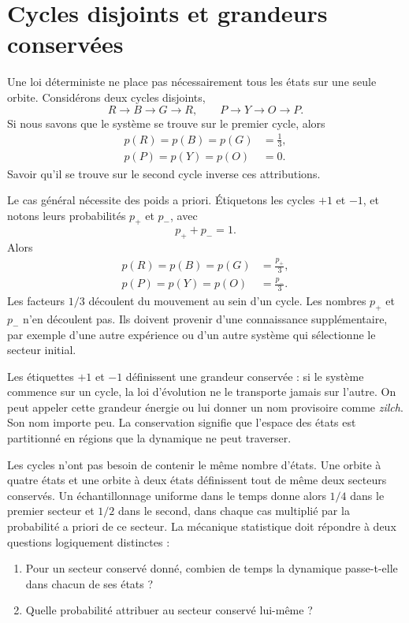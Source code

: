 \section{Cycles disjoints et grandeurs conservées}

Une loi déterministe ne place pas nécessairement tous les états sur une seule orbite. Considérons deux cycles disjoints,
\begin{equation}
 R\longrightarrow B\longrightarrow G\longrightarrow R,
 \qquad
 P\longrightarrow Y\longrightarrow O\longrightarrow P.
 \label{eq:sm1-two-cycles}
\end{equation}
Si nous savons que le système se trouve sur le premier cycle, alors
\begin{equation}
 \begin{aligned}
 p(R)=p(B)=p(G)&=\frac13,\\
 p(P)=p(Y)=p(O)&=0.
 \end{aligned}
\end{equation}
Savoir qu’il se trouve sur le second cycle inverse ces attributions.

Le cas général nécessite des poids a priori. Étiquetons les cycles \(+1\) et
\(-1\), et notons leurs probabilités \(p_+\) et \(p_-\), avec
\begin{equation}
 p_++p_-=1.
\end{equation}
Alors
\begin{align}
 p(R)=p(B)=p(G)&=\frac{p_+}{3},\\
 p(P)=p(Y)=p(O)&=\frac{p_-}{3}.
 \label{eq:sm1-sector-weights}
\end{align}
Les facteurs \(1/3\) découlent du mouvement au sein d’un cycle. Les nombres \(p_+\)
et \(p_-\) n’en découlent pas. Ils doivent provenir d’une connaissance supplémentaire, par exemple d’une autre expérience ou d’un autre système qui sélectionne le secteur initial.

Les étiquettes \(+1\) et \(-1\) définissent une grandeur conservée : si le système commence sur un cycle, la loi d’évolution ne le transporte jamais sur l’autre. On peut appeler cette grandeur énergie ou lui donner un nom provisoire comme \emph{zilch}. Son nom importe peu. La conservation signifie que l’espace des états est partitionné en régions que la dynamique ne peut traverser.

Les cycles n’ont pas besoin de contenir le même nombre d’états. Une orbite à quatre états et une orbite à deux états définissent tout de même deux secteurs conservés. Un échantillonnage uniforme dans le temps donne alors \(1/4\) dans le premier secteur et \(1/2\) dans le second, dans chaque cas multiplié par la probabilité a priori de ce secteur. La mécanique statistique doit répondre à deux questions logiquement distinctes :
\begin{enumerate}
\item Pour un secteur conservé donné, combien de temps la dynamique passe-t-elle dans chacun de ses états ?
\item Quelle probabilité attribuer au secteur conservé lui-même ?
\end{enumerate}

